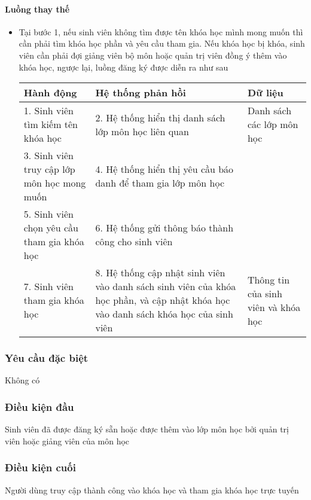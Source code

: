 \documentclass[./../main_file.tex]{subfiles}
\begin{document}
\paragraph{Luồng thay thế}
\begin{itemize}
	\item Tại bước 1, nếu sinh viên không tìm được tên khóa học mình mong muốn thì cần phải tìm khóa học phần và yêu cầu tham gia. Nếu khóa học bị khóa, sinh viên cần phải đợi giảng viên bộ môn hoặc quản trị viên đồng ý thêm vào khóa học, ngược lại, luồng đăng ký được diễn ra như sau
	\begin{table}[H]
					\begin{tabular}{|p{.33\textwidth}|p{}|p{}|}
			\hline
			\textbf{Hành động}                          & \textbf{Hệ thống phản hồi}                                    & \textbf{Dữ liệu}          \\ \hline
			1. Sinh viên tìm kiếm tên khóa học           & 2. Hệ thống hiển thị danh sách lớp môn học liên quan          & Danh sách các lớp môn học \\ \hline
			3. Sinh viên truy cập lớp môn học mong muốn & 4. Hệ thống hiển thị yêu cầu báo danh để tham gia lớp môn học &                           \\ \hline
			5. Sinh viên chọn  yêu cầu tham gia khóa học & 6. Hệ thống gửi thông báo thành công cho sinh viên            &                           \\ \hline
			7. Sinh viên tham gia khóa học &
			8. Hệ thống cập nhật sinh viên vào danh sách sinh viên của khóa học phần, và cập nhật khóa học vào danh sách khóa học của sinh viên &
			Thông tin của sinh viên và khóa học \\ \hline
		\end{tabular}
	\end{table}
\end{itemize}
\subsubsection{Yêu cầu đặc biệt}
Không có

\subsubsection{Điều kiện đầu}
Sinh viên đã được đăng ký sẵn hoặc được thêm vào lớp môn học bởi quản trị viên hoặc giảng viên của môn học

\subsubsection{Điều kiện cuối}
Người dùng truy cập thành công vào khóa học và tham gia khóa học trực tuyến
\end{document}
